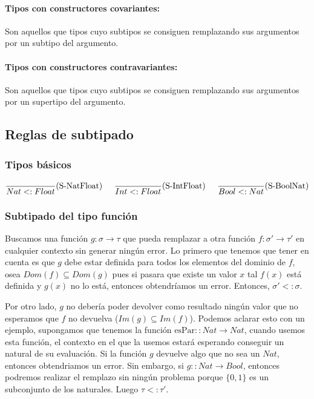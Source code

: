 \paragraph{Tipos con constructores covariantes:} Son aquellos que tipos cuyo subtipos se consiguen remplazando sus argumentos por un subtipo del argumento.

\paragraph{Tipos con constructores contravariantes:} Son aquellos que tipos cuyo subtipos se consiguen remplazando sus argumentos por un supertipo del argumento.


\subsection{Reglas de subtipado}
\subsubsection{Tipos básicos}
\begin{align*}
\frac{}{Nat <: Float}(\text{S-NatFloat}) \hspace*{5mm}\frac{}{Int <: Float}(\text{S-IntFloat}) \hspace*{5mm}\frac{}{Bool <: Nat}(\text{S-BoolNat})
\end{align*}


\subsubsection{Subtipado del tipo función}
Buscamos una función $g:\sigma\to\tau$ que pueda remplazar a otra función $f:\sigma'\to\tau'$ en cualquier contexto sin generar ningún error. 
Lo primero que tenemos que tener en cuenta es que $g$ debe estar definida para todos los elementos del dominio de $f$, osea $Dom(f)\subseteq Dom(g)$ pues si pasara que existe un valor $x$ tal $f(x)$ está definida y $g(x)$ no lo está, entonces obtendríamos un error. Entonces, $\sigma' <: \sigma$.

Por otro lado, $g$ no debería poder devolver como resultado ningún valor que no esperamos que $f$ no devuelva ($Im(g)\subseteq Im(f)$). Podemos aclarar esto con un ejemplo, supongamos que tenemos la función $\text{esPar} :: Nat\to Nat$, cuando usemos esta función, el contexto en el que la usemos estará esperando conseguir un natural de su evaluación. Si la función $g$ devuelve algo que no sea un $Nat$, entonces obtendriamos un error. Sin embargo, si $g :: Nat\to Bool$, entonces podremos realizar el remplazo sin ningún problema porque $\{0,1\}$ es un subconjunto de los naturales. Luego $\tau <: \tau'$.


